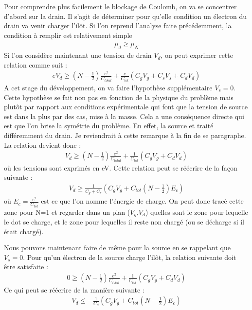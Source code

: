 Pour comprendre plus facilement le blockage de Coulomb, on va se concentrer d'abord sur la drain. Il s'agit de déterminer pour qu'elle condition un électron du drain va venir charger l'ilôt. Si l'on reprend l'analyse faite précédemment, la condition à remplir est relativement simple
\begin{eqnarray}
\mu_d \ge \mu_N
\end{eqnarray}
Si l'on considère maintenant une tension de drain $V_d$, on peut exprimer cette relation comme suit : 
\begin{eqnarray}
eV_d \ge (N-\frac{1}{2})\frac{e^2}{C_{total}} + \frac{e}{C_{tot}}(C_gV_g + C_sV_s + C_dV_d)
\end{eqnarray}
A cet stage du développement, on va faire l'hypothèse supplémentaire $V_s=0$. Cette hypothèse se fait non pas en fonction de la physique du problème mais plut\^ot par rapport aux conditions expérimentale qui font que la tension de source est dans la plus par des cas, mise à la masse. Cela a une conséquence directe qui est que l'on brise la symétrie du problème. En effet, la source et traité différemment du drain. Je reviendrait à cette remarque à la fin de se paragraphe.
La relation devient donc :
\begin{eqnarray}
V_d \ge (N-\frac{1}{2})\frac{e^2}{C_{total}} + \frac{1}{C_{tot}}(C_gV_g + C_dV_d)
\end{eqnarray}
où les tensions sont exprimés en eV.
Cette relation peut se réécrire de la façon suivante :
\begin{eqnarray}
V_d  \ge \frac{1}{C_g + C_s} (C_gV_g + C_{tot}(N-\frac{1}{2})E_c)
\end{eqnarray}
où $E_c= \frac{e^2}{C_{tot}}$ est ce que l'on nomme l'énergie de charge. On peut donc tracé cette zone pour N=1 et regarder dans un plan ($V_g$,$V_d$) quelles sont le zone pour lequelle le dot se charge, et le zone pour lequelles il reste non chargé (ou se décharge si il était chargé).


Nous pouvons maintenant faire de m\^eme pour la source en se rappelant que $V_s=0$. Pour qu'un électron de la source charge l'il\^ot, la relation suivante doit \^etre satisfaite :
\begin{eqnarray}
0 \ge (N-\frac{1}{2})\frac{e^2}{C_{total}} + \frac{1}{C_{tot}}(C_gV_g + C_dV_d)
\end{eqnarray}
Ce qui peut se réécrire de la manière suivante :
\begin{eqnarray}
V_d \le -\frac{1}{C_d}(C_gV_g + C_{tot}(N-\frac{1}{2})E_c)
\end{eqnarray}

